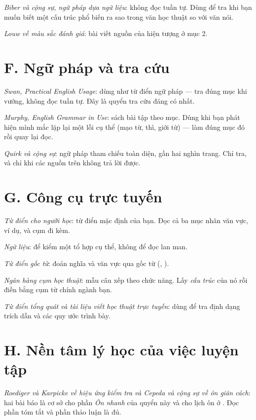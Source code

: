 \documentclass[english.tex]{subfiles}
\begin{document}
\emph{Biber và cộng sự, ngữ pháp dựa ngữ liệu}\cite{biber1999}: không đọc tuần tự. Dùng để tra khi bạn muốn biết một cấu trúc phổ biến ra sao trong văn học thuật so với văn nói.

\emph{Louw về màu sắc đánh giá}\cite{louw1993}: bài viết nguồn của hiện tượng ở  mục 2.

\section*{F. Ngữ pháp và tra cứu}

\emph{Swan, \emph{Practical English Usage}}\cite{swan2016}: dùng như từ điển ngữ pháp --- tra đúng mục khi vướng, không đọc tuần tự. Đây là quyển tra cứu đáng có nhất.

\emph{Murphy, \emph{English Grammar in Use}}\cite{murphy2019}: sách bài tập theo mục. Dùng khi bạn phát hiện mình mắc lặp lại một lỗi cụ thể (mạo từ, thì, giới từ) --- làm đúng mục đó rồi quay lại đọc.

\emph{Quirk và cộng sự}\cite{quirk1985}: ngữ pháp tham chiếu toàn diện, gần hai nghìn trang. Chỉ tra, và chỉ khi các nguồn trên không trả lời được.

\section*{G. Công cụ trực tuyến}

\emph{Từ điển cho người học}\cite{oald,ldoce}: từ điển mặc định của bạn. Đọc cả ba mục nhãn văn vực, ví dụ, và cụm đi kèm.

\emph{Ngữ liệu}\cite{coca}: để kiểm một tổ hợp cụ thể, không để đọc lan man.

\emph{Từ điển gốc từ}\cite{etymonline}: đoán nghĩa và văn vực qua gốc từ (, ).

\emph{Ngân hàng cụm học thuật}\cite{manchesterphrasebank}: mẫu câu xếp theo chức năng. Lấy \emph{cấu trúc} của nó rồi điền bằng cụm từ chính ngành bạn.

\emph{Từ điển tổng quát}\cite{mw} \emph{và tài liệu viết học thuật trực tuyến}\cite{purdueowl}: dùng để tra định dạng trích dẫn và các quy ước trình bày.

\section*{H. Nền tâm lý học của việc luyện tập}

\emph{Roediger và Karpicke về hiệu ứng kiểm tra}\cite{roediger2006} \emph{và Cepeda và cộng sự về ôn giãn cách}\cite{cepeda2006}: hai bài báo là cơ sở cho phần \emph{Ôn nhanh} của quyển này và cho lịch ôn ở . Đọc phần tóm tắt và phần thảo luận là đủ.
\end{document}
